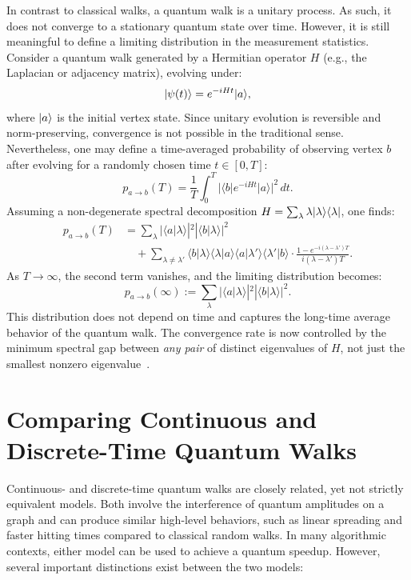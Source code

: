 \documentclass[12pt]{report}
\begin{document}
In contrast to classical walks, a quantum walk is a unitary process. As such, it does not converge to a stationary quantum state over time. However, it is still meaningful to define a limiting distribution in the measurement statistics. Consider a quantum walk generated by a Hermitian operator \( H \) (e.g., the Laplacian or adjacency matrix), evolving under:
\[
\lvert\psi(t)\rangle = e^{-iHt} \lvert a\rangle,
\]
where \( \lvert a\rangle \) is the initial vertex state. Since unitary evolution is reversible and norm-preserving, convergence is not possible in the traditional sense. Nevertheless, one may define a time-averaged probability of observing vertex \( b \) after evolving for a randomly chosen time \( t \in [0, T] \):
\[
p_{a \to b}(T) = \frac{1}{T} \int_0^T |\langle b | e^{-iHt} | a \rangle|^2 \, dt.
\]
Assuming a non-degenerate spectral decomposition \( H = \sum_\lambda \lambda \lvert\lambda\rangle\langle\lambda\rvert \), one finds:
\begin{align}
p_{a \to b}(T) &= \sum_\lambda |\langle a | \lambda \rangle|^2 |\langle b | \lambda \rangle|^2 \\
&\quad + \sum_{\lambda \neq \lambda'} \langle b | \lambda \rangle \langle \lambda | a \rangle \langle a | \lambda' \rangle \langle \lambda' | b \rangle \cdot \frac{1 - e^{-i(\lambda - \lambda')T}}{i(\lambda - \lambda')T}.
\end{align}
As \( T \to \infty \), the second term vanishes, and the limiting distribution becomes:
\[
p_{a \to b}(\infty) := \sum_\lambda |\langle a | \lambda \rangle|^2 |\langle b | \lambda \rangle|^2.
\]
This distribution does not depend on time and captures the long-time average behavior of the quantum walk. The convergence rate is now controlled by the minimum spectral gap between \emph{any pair} of distinct eigenvalues of \( H \), not just the smallest nonzero eigenvalue~\cite{childs2022quantum}.






\section{Comparing Continuous and Discrete-Time Quantum Walks}



Continuous- and discrete-time quantum walks are closely related, yet not strictly equivalent models. Both involve the interference of quantum amplitudes on a graph and can produce similar high-level behaviors, such as linear spreading and faster hitting times compared to classical random walks. In many algorithmic contexts, either model can be used to achieve a quantum speedup. However, several important distinctions exist between the two models:
\end{document}
